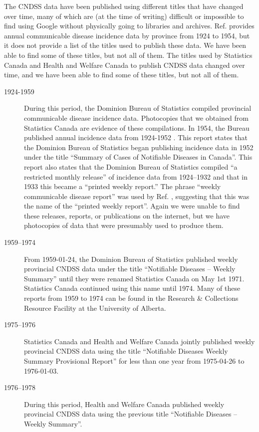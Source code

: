 \documentclass[12pt]{article}
\begin{document}
The CNDSS data have been published using different titles that have changed over time, many of which are (at the time of writing) difficult or impossible to find using Google without physically going to libraries and archives. Ref. \cite{summaryNotifiable1954} provides annual communicable disease incidence data by province from 1924 to 1954,  but it does not provide a list of the titles used to publish these data. We have been able to find some of these titles, but not all of them. The titles used by Statistics Canada and Health and Welfare Canada to publish CNDSS data changed over time, and we have been able to find some of these titles, but not all of them. 

\begin{description}
\item[1924-1959] During this period, the Dominion Bureau of Statistics compiled provincial communicable disease incidence data. Photocopies that we obtained from Statistics Canada are evidence of these compilations. In 1954, the Bureau published annual incidence data from 1924-1952 \cite{summaryNotifiable1954}. This report states that the Dominion Bureau of Statistics began publishing incidence data in 1952 under the title ``Summary of Cases of Notifiable Diseases in Canada''. This report also states that the Dominion Bureau of Statistics compiled ``a restricted monthly release'' of incidence data from 1924--1932 and that in 1933 this became a ``printed weekly report.'' The  phrase ``weekly communicable disease report'' was used by Ref. \cite{summaryNotifiable1954}, suggesting that this was the name of the ``printed weekly report''. Again we were unable to find these releases, reports, or publications on the internet, but we have photocopies of data that were presumably used to produce them.
\item[1959--1974] From 1959-01-24, the Dominion Bureau of Statistics published weekly provincial CNDSS data under the title ``Notifiable Diseases -- Weekly Summary'' until they were renamed Statistics Canada on May 1st 1971. Statistics Canada continued using this name until 1974. Many of these reports from 1959 to 1974 can be found in the Research \& Collections Resource Facility at the University of Alberta.
\item[1975--1976] Statistics Canada and Health and Welfare Canada jointly published weekly provincial CNDSS data using the title ``Notifiable Diseases Weekly Summary Provisional Report'' for less than one year from 1975-04-26 to 1976-01-03.
\item[1976--1978] During this period, Health and Welfare Canada published weekly provincial CNDSS data using the previous title ``Notifiable Diseases -- Weekly Summary''.

\end{description}
\end{document}
